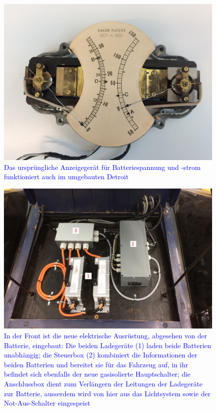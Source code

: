\begin{landscape}
\begin{figure}[h]
		\includegraphics[width=1.30\textwidth]{images/Anhang/Volt_Ampere.jpg}
	\caption{\textcolor{blue}{Das ursprüngliche Anzeigegerät für Batteriespannung und -strom funktioniert auch im umgebauten Detroit}}
	\label{fig:Volt_Ampere}
\end{figure}
\begin{figure}[h]
	\centering
		\includegraphics[width=1.30\textwidth]{images/Anhang/Front.jpg}
	\caption{\textcolor{blue}{In der Front ist die neue elektrische Ausrüstung, abgesehen von der Batterie, eingebaut: Die beiden Ladegeräte (1) laden beide Batterien unabhängig; die Steuerbox (2) kombiniert die Informationen der beiden Batterien und bereitet sie für das Fahrzeug auf, in ihr befindet sich ebenfalls der neue gasisolierte Hauptschalter; die Anschlussbox dient zum Verlängern der Leitungen der Ladegeräte zur Batterie, ausserdem wird von hier aus das Lichtsystem sowie der Not-Aus-Schalter eingespeist}}
	\label{fig:Front}
\end{figure}
\newpage
	\end{landscape}

